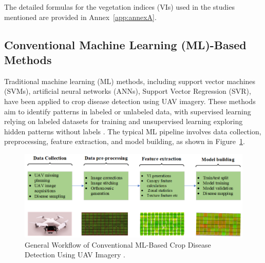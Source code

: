 The detailed formulas for the vegetation indices (VIs) used in the studies mentioned are provided in Annex~\ref{app:annexA}.
\begin{table}[htbp]
    \caption{Summary of ST-based methods for Wheat disease estimation using UAV imagery.}
    \centering
    \label{tab:summary}
\end{table}



\subsection{Conventional Machine Learning (ML)-Based Methods}
Traditional machine learning (ML) methods, including support vector machines (SVMs), artificial neural networks (ANNs), Support Vector Regression (SVR), have been applied to crop disease detection using UAV imagery. These methods aim to identify patterns in labeled or unlabeled data, with supervised learning relying on labeled datasets for training and unsupervised learning exploring hidden patterns without labels \parencite{shahi2023recent}. The typical ML pipeline involves data collection, preprocessing, feature extraction, and model building, as shown in Figure~\ref{fig:MLBased}.

\begin{figure}[H]
    \centering
    \includegraphics[width=0.8
    \textwidth]{chapters/chapter3/images/Figure08.png}
    \caption{General Workflow of Conventional ML-Based Crop Disease Detection Using UAV Imagery \parencite{shahi2023recent}.}
    \label{fig:MLBased}
\end{figure}


